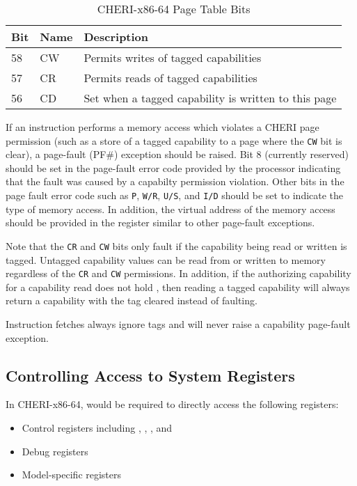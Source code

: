 \begin{table}
\begin{center}
\begin{tabular}{lll}
\toprule
Bit & Name & Description \\
\midrule
58 & CW & Permits writes of tagged capabilities \\
57 & CR & Permits reads of tagged capabilities \\
56 & CD & Set when a tagged capability is written to this page \\
\bottomrule
\end{tabular}
\end{center}
\caption{CHERI-x86-64 Page Table Bits}
\label{table:x86:pte}
\end{table}

If an instruction performs a memory access which violates a CHERI page
permission (such as a store of a tagged capability to a page where the
\texttt{CW} bit is clear), a page-fault (PF\#) exception should be
raised.  Bit 8 (currently reserved) should be set in the page-fault
error code provided by the processor indicating that the fault was
caused by a capabilty permission violation.  Other bits in the page
fault error code such as \texttt{P}, \texttt{W/R}, \texttt{U/S}, and
\texttt{I/D} should be set to indicate the type of memory access.  In
addition, the virtual address of the memory access should be provided
in the \CRTWO{} register similar to other page-fault exceptions.

Note that the \texttt{CR} and \texttt{CW} bits only fault if the
capability being read or written is tagged.  Untagged capability
values can be read from or written to memory regardless of the
\texttt{CR} and \texttt{CW} permissions.  In addition, if the
authorizing capability for a capability read does not hold \cappermLC,
then reading a tagged capability will always return a capability with
the tag cleared instead of faulting.

Instruction fetches always ignore tags and will never raise a
capability page-fault exception.

\subsection{Controlling Access to System Registers}

In CHERI-x86-64, \cappermASR{} would be required to directly access the
following registers:

\begin{itemize}
  \item Control registers including \KCC{}, \KSC{}, \CSTAR{}, and \KGS{}
  \item Debug registers
  \item Model-specific registers
\end{itemize}

